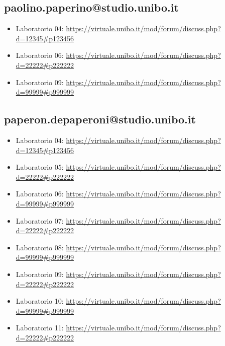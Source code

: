 \documentclass[a4paper,12pt]{report}
\begin{document}
\subsection{paolino.paperino@studio.unibo.it}

\begin{itemize}
 \item Laboratorio 04: \url{https://virtuale.unibo.it/mod/forum/discuss.php?d=12345#p123456}
 \item Laboratorio 06: \url{https://virtuale.unibo.it/mod/forum/discuss.php?d=22222#p222222}
 \item Laboratorio 09: \url{https://virtuale.unibo.it/mod/forum/discuss.php?d=99999#p999999}
\end{itemize}

\subsection{paperon.depaperoni@studio.unibo.it}

\begin{itemize}
 \item Laboratorio 04: \url{https://virtuale.unibo.it/mod/forum/discuss.php?d=12345#p123456}
 \item Laboratorio 05: \url{https://virtuale.unibo.it/mod/forum/discuss.php?d=22222#p222222}
 \item Laboratorio 06: \url{https://virtuale.unibo.it/mod/forum/discuss.php?d=99999#p999999}
 \item Laboratorio 07: \url{https://virtuale.unibo.it/mod/forum/discuss.php?d=22222#p222222}
 \item Laboratorio 08: \url{https://virtuale.unibo.it/mod/forum/discuss.php?d=99999#p999999}
 \item Laboratorio 09: \url{https://virtuale.unibo.it/mod/forum/discuss.php?d=22222#p222222}
 \item Laboratorio 10: \url{https://virtuale.unibo.it/mod/forum/discuss.php?d=99999#p999999}
 \item Laboratorio 11: \url{https://virtuale.unibo.it/mod/forum/discuss.php?d=22222#p222222}
\end{itemize}




\end{document}
